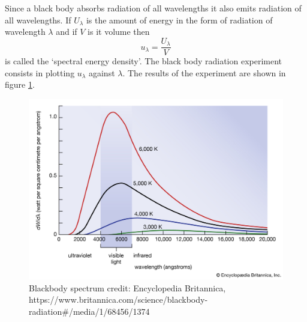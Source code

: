 Since a black body absorbs radiation of all wavelengths it also emits radiation
of all wavelengths. If $U_\lambda$ is the amount of energy in the form of 
radiation of wavelength $\lambda$ and if $V$ is it volume then 
\begin{equation}\label{c2s1e1}
u_\lambda = \frac{U_\lambda}{V}
\end{equation}
is called the `spectral energy density'. The black body radiation experiment
consists in plotting $u_\lambda$ against $\lambda$. The results of the 
experiment are shown in figure \ref{c2f1}. 
\begin{figure}
\begin{center}
\includegraphics[scale=0.20]{bb}
\caption{Blackbody spectrum credit: Encyclopedia Britannica,\\
https://www.britannica.com/science/blackbody-radiation\#/media/1/68456/1374}
\label{c2f1}
\end{center}
\end{figure}

